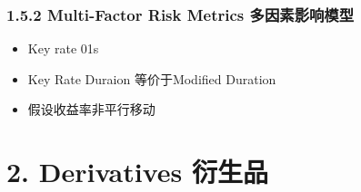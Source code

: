 \documentclass[a4paper,6pt,twoside,openany]{article}
\begin{document}
\subsubsection*{1.5.2 Multi-Factor Risk Metrics 多因素影响模型}
\begin{itemize}
\item Key rate 01s
\item Key Rate Duraion 等价于Modified Duration
\item 假设收益率非平行移动

\end{itemize}

\newpage

\section*{2. Derivatives 衍生品}
\end{document}
